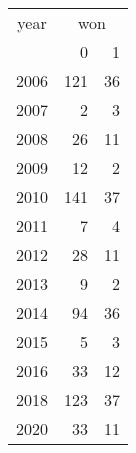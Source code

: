 \footnotesize\begin{tabular}[t]{lrr}
\toprule
\multicolumn{1}{c}{year} & \multicolumn{2}{c}{won} \\
\cmidrule(l{3pt}r{3pt}){1-1} \cmidrule(l{3pt}r{3pt}){2-3}
  & 0 & 1\\
\midrule
2006 & 121 & 36\\
2007 & 2 & 3\\
2008 & 26 & 11\\
2009 & 12 & 2\\
2010 & 141 & 37\\
2011 & 7 & 4\\
2012 & 28 & 11\\
2013 & 9 & 2\\
2014 & 94 & 36\\
2015 & 5 & 3\\
2016 & 33 & 12\\
2018 & 123 & 37\\
2020 & 33 & 11\\
\bottomrule
\end{tabular}
